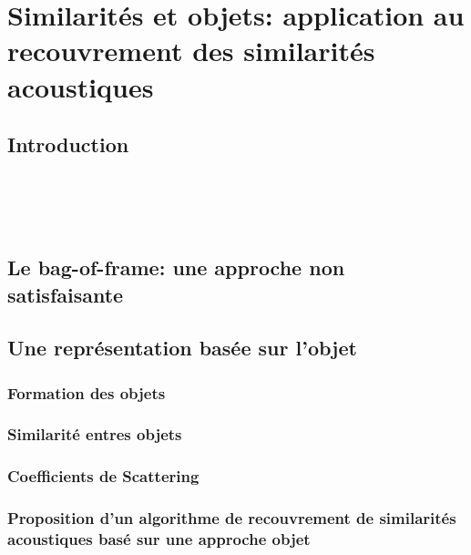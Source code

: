 \chapter[Similarités et objets]{Similarités et objets: application au recouvrement des similarités acoustiques}\label{ch:ml_xp}


\section{Introduction}
\label{sec:ch8_intro}

 \\ 

 \\ 

 \\

\section{Le bag-of-frame: une approche non satisfaisante}


\section{Une représentation basée sur l'objet}

\subsection{Formation des objets}

\subsection{Similarité entres objets}

\subsection{Coefficients de Scattering}


\subsection[Proposition d'un algorithme]{Proposition d'un algorithme de recouvrement de similarités acoustiques basé sur une approche objet}
\label{sec:ch8_algoObjet}

